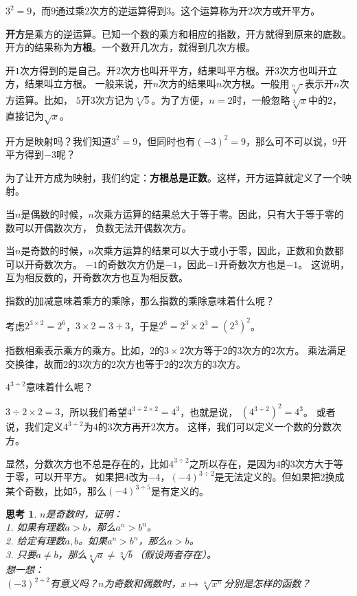 \documentclass[12pt,UTF8]{ctexbook}
\newtheorem{sk}{思考}[section]
\begin{document}
$3^2 = 9$，而$9$通过乘$2$次方的逆运算得到$3$。这个运算称为开$2$次方或开平方。

\textbf{开方}是乘方的逆运算。已知一个数的乘方和相应的指数，开方就得到原来的底数。
开方的结果称为\textbf{方根}。一个数开几次方，就得到几次方根。

开$1$次方得到的是自己。开$2$次方也叫开平方，结果叫平方根。开$3$次方也叫开立方，结果叫立方根。
一般来说，开$n$次方的结果叫$n$次方根。一般用$\sqrt[n]{\cdot}$表示开$n$次方运算。比如，
$5$开$3$次方记为$\sqrt[3]{5}$。为了方便，$n=2$时，一般忽略$\sqrt[2]{x}$中的$2$，直接记为$\sqrt{x}$。

开方是映射吗？我们知道$3^2 =9$，但同时也有$(-3)^2 =9$，那么可不可以说，$9$开平方得到$-3$呢？

为了让开方成为映射，我们约定：\textbf{方根总是正数}。这样，开方运算就定义了一个映射。

当$n$是偶数的时候，$n$次乘方运算的结果总大于等于零。因此，只有大于等于零的数可以开偶数次方，
负数无法开偶数次方。

当$n$是奇数的时候，$n$次乘方运算的结果可以大于或小于零，因此，正数和负数都可以开奇数次方。
$-1$的奇数次方仍是$-1$，因此$-1$开奇数次方也是$-1$。
这说明，互为相反数的，开奇数次方也互为相反数。

指数的加减意味着乘方的乘除，那么指数的乘除意味着什么呢？

考虑$2^{3\times 2} = 2^6$，$3\times 2 = 3 + 3$，于是$2^6 = 2^3 \times 2^3 = \left(2^3\right)^2$。

指数相乘表示乘方的乘方。比如，$2$的$3\times 2$次方等于$2$的$3$次方的$2$次方。
乘法满足交换律，故而$2$的$3$次方的$2$次方也等于$2$的$2$次方的$3$次方。

$4^{3\div 2}$意味着什么呢？

$3\div 2 \times 2 = 3$，所以我们希望$4^{3\div 2 \times 2} = 4^3$，也就是说，
$\left(4^{3\div 2}\right)^2 = 4^3$。
或者说，我们定义$4^{3\div 2}$为$4$的$3$次方再开$2$次方。
这样，我们可以定义一个数的分数次方。

显然，分数次方也不总是存在的，比如$4^{3\div 2}$之所以存在，是因为$4$的$3$次方大于等于零，可以开平方。
如果把$4$改为$-4$，$(-4)^{3\div 2}$是无法定义的。但如果把$2$换成某个奇数，比如$5$，那么$(-4)^{3\div 5}$是有定义的。

\begin{sk}\label{sk:3-0-0}
    $n$是奇数时，证明：\\
    1. 如果有理数$a > b$，那么$a^n > b^n$。\\
    2. 给定有理数$a, b$。如果$a^n > b^n$，那么$a > b$。\\
    3. 只要$a \neq b$，那么$\sqrt[n]{a} \neq \sqrt[n]{b}$（假设两者存在）。\\
    想一想：\\
    $(-3)^{2\div 2}$有意义吗？$n$为奇数和偶数时，$x \mapsto \sqrt[n]{x^n}$分别是怎样的函数？
\end{sk}
\end{document}

